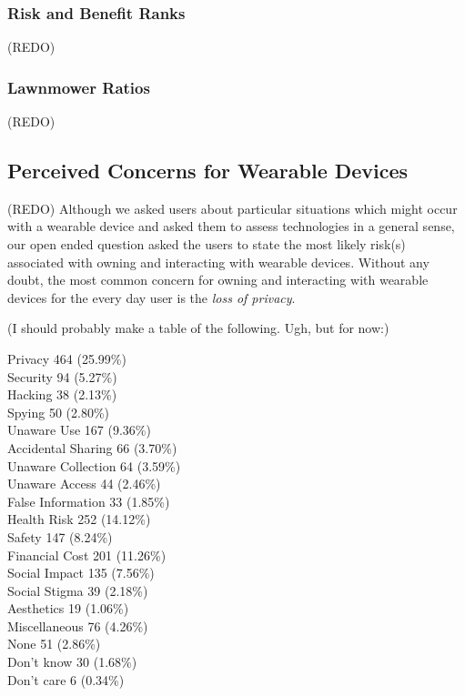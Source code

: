 \documentclass{acm_proc_article-sp}
\begin{document}
\subsubsection{Risk and Benefit Ranks} 
(REDO) 

\subsubsection{Lawnmower Ratios} 
(REDO) 

\subsection{Perceived Concerns for Wearable Devices}
(REDO) Although we asked users about particular situations which might occur with a wearable device and asked them to assess technologies in a general sense, our open ended question asked the users to state the most likely risk(s) associated with owning and interacting with wearable devices. Without any doubt, the most common concern for owning and interacting with wearable devices for the every day user is the \textit{loss of privacy}. 

(I should probably make a table of the following. Ugh, but for now:)

Privacy 				464 (25.99\%) \\
Security 				94 (5.27\%)\\
Hacking 				38 (2.13\%)\\
Spying 				50 (2.80\%)\\ [-.5cm]

Unaware Use 			167 (9.36\%)\\
Accidental Sharing 		66 (3.70\%)\\
Unaware Collection		64 (3.59\%)\\
Unaware Access	 	44 (2.46\%)\\
False Information 		33 (1.85\%)\\[-.5cm]

Health Risk 			252 (14.12\%)\\
Safety 				147 (8.24\%)\\
Financial Cost	 		201 (11.26\%)\\[-.5cm]

Social Impact 			135 (7.56\%)\\
Social Stigma 			39 (2.18\%)\\
Aesthetics 			19 (1.06\%)\\[-.5cm]

Miscellaneous 		76 (4.26\%)\\
None				51 (2.86\%)\\
Don't know			 30 (1.68\%)\\
Don't care 			6 (0.34\%)\\
\end{document}
